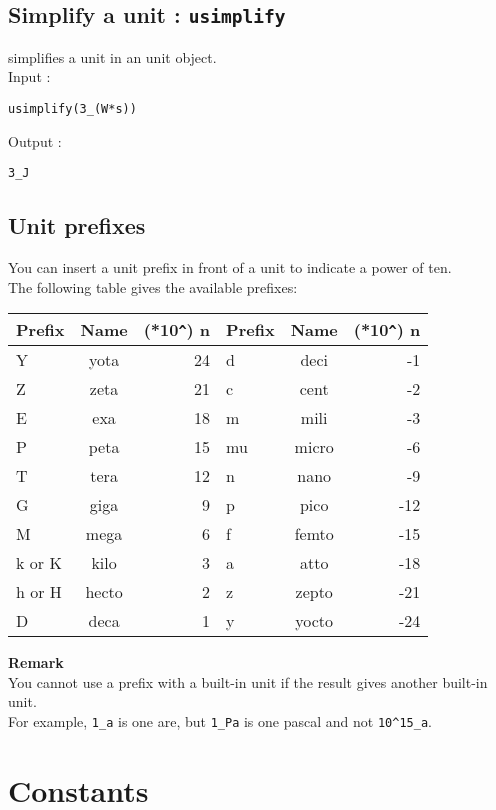 \documentclass[a4paper,11pt]{book}
\begin{document}
\subsection{Simplify a unit : {\tt usimplify}}
 simplifies a unit in an unit object.\\
Input :
\begin{center}{\tt usimplify(3\_(W*s))}\end{center}
Output :
\begin{center}{\tt 3\_J}\end{center}

\subsection{Unit prefixes}
You can insert a unit prefix in front of a unit to indicate a power of ten.\\
The following table gives the available prefixes:
\begin{center}
\begin{tabular}{|l|c|r||l|c|r|}
\hline
Prefix & Name & (*10\verb|^|) n & Prefix & Name & (*10\verb|^|) n \\
\hline
Y & yota & 24 & d & deci & -1\\
Z & zeta & 21 & c & cent & -2\\
E & exa & 18 & m & mili & -3\\
P & peta & 15 & mu & micro &-6\\
T & tera & 12 & n & nano & -9\\
G & giga & 9 & p & pico & -12\\
M & mega & 6 & f & femto & -15\\
k or K & kilo & 3 & a & atto & -18\\
h or H & hecto & 2 & z & zepto & -21\\
D & deca & 1 & y & yocto &-24\\
\hline
\end{tabular}
\end{center}
{\bf Remark}\\
You cannot use a prefix with a built-in unit if the result gives another 
built-in unit.\\
For example, 
{\tt 1\_a} is one are, but {\tt 1\_Pa} is one pascal and not 
{\tt 10\verb|^|15\_a}.
 
\section{Constants}
\end{document}
